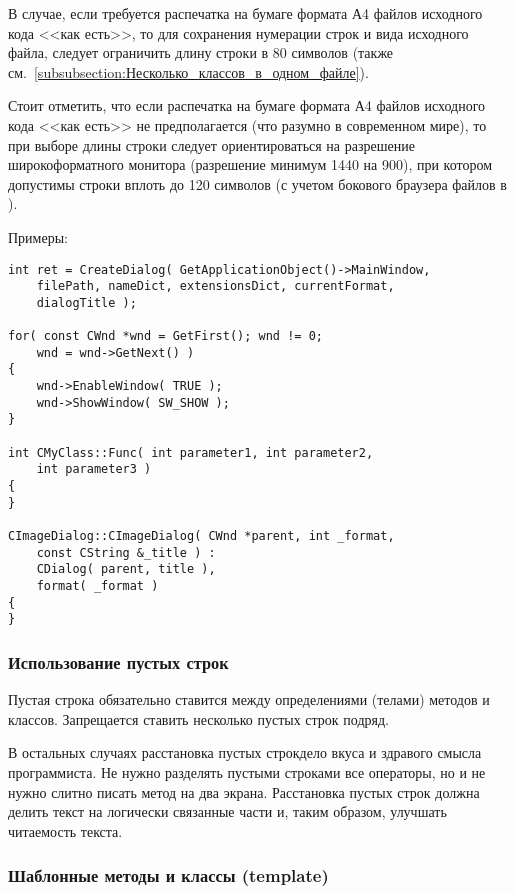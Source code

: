{{{В случае, если требуется распечатка на бумаге формата А4 файлов исходного кода <<как есть>>, то для сохранения нумерации строк и вида исходного файла, следует ограничить длину строки в 80 символов (также см.~\ref{subsubsection:Несколько_классов_в_одном_файле}).

Стоит отметить, что если распечатка на бумаге формата А4 файлов исходного кода <<как есть>> не предполагается (что разумно в современном мире), то при выборе длины строки следует ориентироваться на разрешение широкоформатного монитора (разрешение минимум 1440 на 900), при котором допустимы строки вплоть до 120 символов (с учетом бокового браузера файлов в ).

Примеры:
\begin{lstlisting}[frame=single]
int ret = CreateDialog( GetApplicationObject()->MainWindow,
    filePath, nameDict, extensionsDict, currentFormat,
    dialogTitle );

for( const CWnd *wnd = GetFirst(); wnd != 0;
    wnd = wnd->GetNext() )
{
    wnd->EnableWindow( TRUE );
    wnd->ShowWindow( SW_SHOW );
}

int CMyClass::Func( int parameter1, int parameter2,
    int parameter3 )
{
}

СImageDialog::СImageDialog( СWnd *parent, int _format,
    const СString &_title ) :
    СDialog( parent, title ),
    format( _format )
{
}
\end{lstlisting}

\newpage
\subsubsection{Использование пустых строк}

Пустая строка обязательно ставится между определениями (телами) методов и классов. Запрещается ставить несколько пустых строк подряд.

В остальных случаях расстановка пустых строк\mdash дело вкуса и здравого смысла программиста. Не нужно разделять пустыми строками все операторы, но и не нужно слитно писать метод на два экрана. Расстановка пустых строк должна делить текст на логически связанные части и, таким образом, улучшать читаемость текста.

\subsubsection{Шаблонные методы и классы (template)}

}}}
